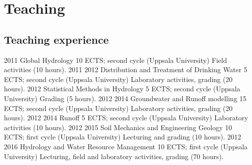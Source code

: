 \section{Teaching}

\subsection{Teaching experience}
  \teaching
    {2011}
    {Global Hydrology}
    {10 ECTS; second cycle (Uppsala University)}
    {Field activities (10 hours).}
  \teaching
    {2011 \textemdash{} 2012}
    {Distribution and Treatment of Drinking Water}
    {5 ECTS; second cycle (Uppsala University)}
    {Laboratory activities, grading (20 hours).}
  \teaching
    {2012}
    {Statistical Methods in Hydrology}
    {5 ECTS; second cycle (Uppsala University)}
    {Grading (5 hours).}
  \teaching
    {2012 \textemdash{} 2014}
    {Groundwater and Runoff modelling}
    {15 ECTS; second cycle (Uppsala University)}
    {Laboratory activities, grading (20 hours).}
  \teaching
    {2012 \textemdash{} 2014}
    {Runoff}
    {5 ECTS; second cycle (Uppsala University)}
    {Laboratory activities (10 hours).}
  \teaching
    {2012 \textemdash{} 2015}
    {Soil Mechanics and Engineering Geology}
    {10 ECTS; first cycle (Uppsala University)}
    {Lecturing and grading (10 hours).}
  \teaching
    {2012 \textemdash{} 2016}
    {Hydrology and Water Resource Management}
    {10 ECTS; first cycle (Uppsala University)}
    {Lecturing, field and laboratory activities, grading (70 hours).}
